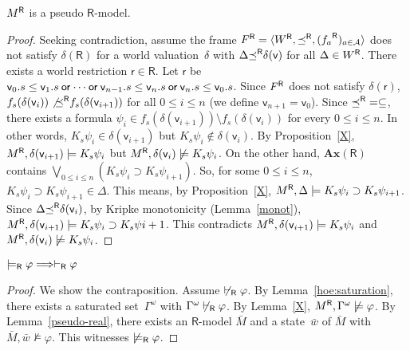   \begin{lemma}
   ${M}^{\mathsf R}$ is a pseudo $\mathsf R$-model.
  \end{lemma}
  \begin{proof}
   Seeking contradiction,
   assume the frame ${F}^{\mathsf R} = \langle{{W}^{\mathsf R}, {\preceq}^{\mathsf R}, ({f_a}^{\mathsf R})_{a\in\mathcal A}}\rangle$
   does not satisfy $\delta(\mathsf R)$ for
   a world valuation~$\delta$ with
   $\Delta{\preceq}^{\mathsf R}\delta(\mathsf v)$ for all $\Delta\in{W}^{\mathsf R}$.
   There exists a world restriction
   $\mathsf r\in\mathsf R$.
   Let $\mathsf r$ be $\mathsf v_0.s\le\mathsf v_1.s\mathbin{\mathsf{or}}\cdots \mathbin{\mathsf{or}}\mathsf
   v_{n-1}.s\le\mathsf v_n.s\mathbin{\mathsf{or}}\mathsf v_n.s\le\mathsf v_0.s$.
   Since ${F}^{\mathsf R}$ does not satisfy $\delta(\mathsf r)$,
   $f_s(\delta(\mathsf v_i))\not{{\preceq}^{\mathsf R}}f_s(\delta(\mathsf v_{i+1}))$
   for
   all $0\le i\le n$ (we define $\mathsf v_{n+1} = \mathsf v_0$).
   Since ${\preceq}^{\mathsf R} = \subseteq$, there exists
   a formula $\psi_i\in f_s(\delta(\mathsf v_{i+1}))\setminus
   f_s(\delta(\mathsf v_i))$ for every $0\le i\le n$.
   In other words, $K_s\psi_i\in\delta(\mathsf v_{i+1})$
   but $K_s\psi_i\notin\delta(\mathsf v_i)$.
   By Proposition~\ref{X},
   ${M}^{\mathsf R},\delta(\mathsf v_{i+1})\models K_s\psi_i$ but
   ${M}^{\mathsf R},\delta(\mathsf v_{i})\not\models K_s\psi_i$.
   On the other hand, $\mathbf{Ax}(\mathsf R)$ contains
   $\bigvee_{0\le i\le n}\left(K_s\psi_i\supset K_s\psi_{i+1}\right)$.
   So, for some $0\le i\le n$,
   $K_s\psi_i\supset K_s\psi_{i+1}\in\Delta$.
   This means, by Proposition~\ref{X},
   ${M}^{\mathsf R},\Delta\models K_s\psi_i\supset K_s\psi_{i+1}$.
   Since $\Delta{\preceq}^{\mathsf R}\delta(\mathsf v_i)$,
   by Kripke monotonicity (Lemma~\ref{monot}),
   ${M}^{\mathsf R},\delta(\mathsf v_{i+1})\models K_s\psi_i\supset K_s\psi{i+1}$.
   This contradicts ${M}^{\mathsf R},\delta(\mathsf v_{i+1})\models K_s\psi_i$ and
   ${M}^{\mathsf R},\delta(\mathsf v_i)\not\models K_s\psi_i$.
  \end{proof}

  \begin{lemma}[Completeness]
   $\models_{\mathsf R}\varphi\Longrightarrow\vdash_{\mathsf R}\varphi$
  \end{lemma}
  \begin{proof}
   We show the contraposition.
   Assume $\not\vdash_{\mathsf R} \varphi$. By
   Lemma~\ref{hoe:saturation}, there exists
   a saturated set~$\Gamma^\omega$ with $\Gamma^\omega\not\vdash_{\mathsf R}\varphi$.
   By Lemma~\ref{X}, ${M}^{\mathsf R}, \Gamma^\omega\not\models\varphi$.
   By Lemma~\ref{pseudo-real}, there exists an
   $\mathsf R$-model $\bar M$ and a state~$\bar w$ of $\bar M$
   with $\bar M,\bar w\not\models \varphi$.
   This witnesses $\not\models_{\mathsf R}\varphi$.
  \end{proof}
